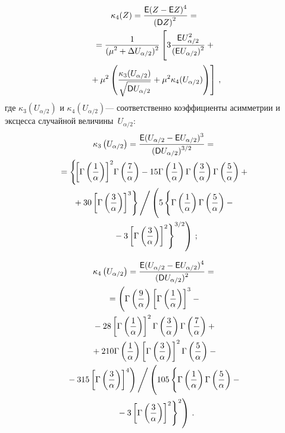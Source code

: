 \begin{multicols}{2}
\vspace*{-12pt}

\noindent
\begin{multline}
\kappa_4(Z)=\fr{{\sf E}(Z-{\sf E}Z)^4}{\left({\sf D}Z\right)^2}={}\\
{}=\fr{1}{(\mu^2+\Delta
U_{\alpha/2})^2}\left[
\vphantom{\fr{\kappa_3(U_{\alpha/2})}{\sqrt{{\sf D}
U_{\alpha/2}}}}
3\fr{{\sf E}U_{\alpha/2}^2}{({\sf E}U_{\alpha/2})^2}+{}\right.\\
\left.{}+
\mu^2\left(\fr{\kappa_3(U_{\alpha/2})}{\sqrt{{\sf D}
U_{\alpha/2}}}+\mu^2\kappa_4(U_{\alpha/2})\right)\right]\,,\label{e5-gr}
\end{multline}
где $\kappa_3(U_{\alpha/2})$ и $\kappa_4(U_{\alpha/2})$--- соответственно 
коэффициенты асимметрии и эксцесса случайной
величины~$U_{\alpha/2}$:
\begin{multline*}
\kappa_3\left(U_{\alpha/2}\right)=\fr{{\sf E}(U_{\alpha/2}-{\sf E}U_{\alpha/2})^3}
{({\sf D}U_{\alpha/2})^{3/2}}={}\\
{}=
\left\{\!
\left[\Gamma\left(\fr{1}{\alpha}\right)\right]^2\!\Gamma\left(\fr{7}{\alpha}\right)-
15\Gamma\left(\fr{1}{\alpha}\right)\Gamma\left(\fr{3}{\alpha}\right)
\Gamma\left(\fr{5}{\alpha}\right)+{}\right.
\\
\left.{}+
30\left[\Gamma\left(\fr{3}{\alpha}\right)\right]^3\right\}\Bigg/
\left( \vphantom{\left(\left[
\Gamma\left(\fr{3}{\alpha}
\right)\right]^2\right)^{3/2}}
5\left\{ \vphantom{\left[ \Gamma\left(\fr{3}{\alpha} \right)\right]^2}
\Gamma\left(\fr{1}{\alpha}\right)
\Gamma\left(\fr{5}{\alpha}\right)-{}\right.\right.\\
\left.\left.{}-3\left[
\Gamma\left(\fr{3}{\alpha}
\right)\right]^2\right\}^{3/2}\right)\,;
\end{multline*}

\vspace*{-12pt}

\noindent
\begin{multline*}
\kappa_4\left(U_{\alpha/2}\right)=
\fr{{\sf E}(U_{\alpha/2}-{\sf E}U_{\alpha/2})^4}
{({\sf D}U_{\alpha/2})^2}={}\\
{}=\left(\Gamma\left(\fr{9}{\alpha}\right)\left[\Gamma\left(\fr{1}{\alpha}\right)\right]^3-{}\right.\\
{}-28\left[\Gamma\left(\fr{1}{\alpha}\right)\right]^2\Gamma
\left(\fr{3}{\alpha}\right)\Gamma\left(\fr{7}{\alpha}\right)+{}\\
{}+
210\Gamma\left(\fr{1}{\alpha}\right)\left[\Gamma\left(\fr{3}{\alpha}\right)\right]^2
\Gamma\left(\fr{5}{\alpha}\right)-{}\\
\left.{}-
315\left[\Gamma\left(\fr{3}{\alpha}\right)\right]^4 \right)\Bigg/ \left(
\vphantom{\left(\left[
\Gamma\left(\fr{3}{\alpha}
\right)\right]^2\right)^{3/2}}
105 \left\{\vphantom{\left[ \Gamma\left(\fr{3}{\alpha} \right)\right]^2}
\Gamma\left(\fr{1}{\alpha}\right)\Gamma\left(\fr{5}{\alpha}\right)-{}\right.\right.\\
\left.\left.{}-
3\left[\Gamma\left(\fr{3}{\alpha}\right)\right]^2\right\}^2\right)\,.
\end{multline*}



\end{multicols}

